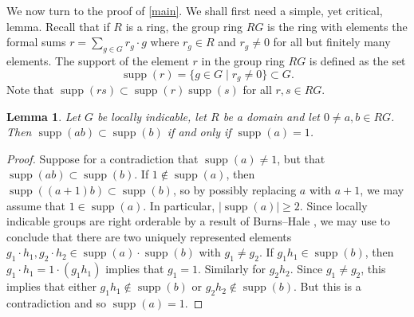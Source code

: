 \documentclass{amsart}
\newtheorem{lemma}[theorem]{Lemma}
\theoremstyle{definition}
\DeclareMathOperator{\supp}{supp}
\begin{document}
We now turn to the proof of \cref{main}. We shall first need a simple, yet critical, lemma. Recall that if $R$ is a ring, the group ring $RG$ is the ring with elements the formal sums $r = \sum_{g\in G}r_g\cdot g$ where $r_g\in R$ and $r_g\neq 0$ for all but finitely many elements. The support of the element $r$ in the group ring $RG$ is defined as the set
\[
\supp(r) = \{g\in G \mid r_g \neq 0\}\subset G.
\]
Note that $\supp(rs)\subset \supp(r)\supp(s)$ for all $r, s\in RG$. 


\begin{lemma}
\label{key_lemma}
Let $G$ be locally indicable, let $R$ be a domain and let $0\neq a, b\in RG$. Then $\supp(ab)\subset\supp(b)$ if and only if $\supp(a) = 1$.
\end{lemma}

\begin{proof}
Suppose for a contradiction that $\supp(a)\neq 1$, but that $\supp(ab)\subset \supp(b)$. If $1\notin \supp(a)$, then $\supp((a+1)b)\subset \supp(b)$, so by possibly replacing $a$ with $a+1$, we may assume that $1\in \supp(a)$. In particular, $|\supp(a)|\geqslant 2$. Since locally indicable groups are right orderable by a result of Burns--Hale \cite{BH72}, we may use \cite[Lemma 13.1.7]{Pa77} to conclude that there are two uniquely represented elements $g_1\cdot h_1, g_2\cdot h_2\in\supp(a)\cdot\supp(b)$ with $g_1\neq g_2$. If $g_1h_1\in \supp(b)$, then $g_1\cdot h_1 = 1\cdot(g_1h_1)$ implies that $g_1 = 1$. Similarly for $g_2h_2$. Since $g_1\neq g_2$, this implies that either $g_1h_1\notin\supp(b)$ or $g_2h_2\notin\supp(b)$. But this is a contradiction and so $\supp(a) = 1$.
\end{proof}
\end{document}

